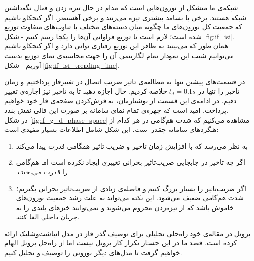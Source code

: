 شبکه‌ی ما متشکل از نورون‌هایی است که مدام در حال تیزه زدن و فعال نگه‌داشتن شبکه هستند. برخی با بسامد بیشتری تیزه می‌زنند و برخی آهسته‌تر. اگر کنجکاو باشیم که جمعیت کل نورون‌های ما چگونه میان دسته‌های مختلف با تناوب‌های متفاوت توزیع شده‌ است؛ لازم است تا توزیع فراوانی آن‌ها را یکجا رسم کنیم - شکل \ref{fig:if_isi}.\\
همان طور که می‌بینید به ظاهر این توزیع رفتاری توانی دارد و اگر کنجکاو باشیم می‌توانیم شیب این نمودار تمام لگاریتمی آن را جهت محاسبه‌ی نمای توزیع بدست آوریم - شکل \ref{fig:if_isi_trending_line}.

در قسمت‌های پیشین تنها به مطالعه‌ی تاثیر ضریب اتصال در تغییرفاز پرداختیم و زمان تاخیر را تنها در $t_d = 0.1 s$ خلاصه کردیم. حال اجازه دهید تا به تاخیر نیز اجازه‌ی تغییر دهیم. در ادامه‌ی این قسمت از نوشتارمان، به فرش‌کردن صفحه‌ی فاز خود خواهیم پرداخت. امید است که چهره‌ی تمام نمای سامانه‌ بر صورت این قالی نقش بندد.\\


در شکل \ref{fig:if_g_d_phase_space} مشاهده می‌کنیم که شدت هم‌گامی در هر کدام از هنگردهای سامانه چقدر است. این شکل شامل اطلاعات بسیار مفیدی است:

\begin{enumerate}[1.]
	\item 
	به نظر می‌رسد که با افزایش زمان تاخیر و ضریب تاثیر همگامی قدرت پیدا می‌کند
	\item 
	اگر چه تاخیر در جابجایی ضریب‌تاثیر بحرانی تغییری ایجاد نکرده است اما هم‌گامی را قدرت می‌بخشد.
	\item
	اگر ضریب‌تاثیر را بسیار بزرگ کنیم و فاصله‌ی زیادی از ضریب‌تاثیر بحرانی بگیریم؛ شدت هم‌گامی ضعیف می‌شود. این نکته می‌تواند به علت رشد جمعیت نورون‌های خاموش باشد که از تیزه‌زدن محروم می‌شوند و نمی‌توانند خیزهای بلندی را به جریان داخلی القا کنند.
\end{enumerate}

برونل در مقاله‌ی خود 
\cite{brunel2000dynamics}
راه‌حلی تحلیلی برای توصیف گذر فاز در مدل انباشت‌وشلیک ارائه کرده است. قصد ما در این جستار تکرار کار برونل نیست اما از راه‌حل برونل الهام خواهیم گرفت تا مدل‌های دیگر نورونی را توصیف و تحلیل کنیم.
